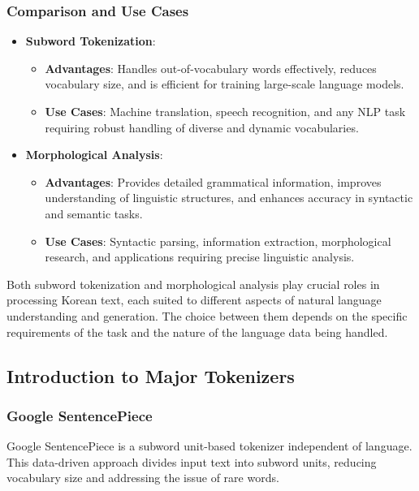 \documentclass{article}
\begin{document}
\subsubsection{Comparison and Use Cases}
\begin{itemize}
\item \textbf{Subword Tokenization}:
    \begin{itemize}
        \item \textbf{Advantages}: Handles out-of-vocabulary words effectively, reduces vocabulary size, and is efficient for training large-scale language models.
        \item \textbf{Use Cases}: Machine translation, speech recognition, and any NLP task requiring robust handling of diverse and dynamic vocabularies.
    \end{itemize}
\item \textbf{Morphological Analysis}:
    \begin{itemize}
        \item \textbf{Advantages}: Provides detailed grammatical information, improves understanding of linguistic structures, and enhances accuracy in syntactic and semantic tasks.
        \item \textbf{Use Cases}: Syntactic parsing, information extraction, morphological research, and applications requiring precise linguistic analysis.
    \end{itemize}
\end{itemize}
Both subword tokenization and morphological analysis play crucial roles in processing Korean text, each suited to different aspects of natural language understanding and generation. The choice between them depends on the specific requirements of the task and the nature of the language data being handled.



\subsection{Introduction to Major Tokenizers}

\subsubsection{Google SentencePiece}

Google SentencePiece is a subword unit-based tokenizer independent of language. This data-driven approach divides input text into subword units, reducing vocabulary size and addressing the issue of rare words.
\end{document}
